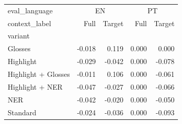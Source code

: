 \begin{tabular}{lrrrr}
\toprule
eval\_language & \multicolumn{2}{c}{EN} & \multicolumn{2}{c}{PT} \\
context\_label & Full & Target & Full & Target \\
variant &  &  &  &  \\
\midrule
Glosses & -0.018 & 0.119 & 0.000 & 0.000 \\
Highlight & -0.029 & -0.042 & 0.000 & -0.078 \\
Highlight + Glosses & -0.011 & 0.106 & 0.000 & -0.061 \\
Highlight + NER & -0.047 & -0.027 & 0.000 & -0.066 \\
NER & -0.042 & -0.020 & 0.000 & -0.050 \\
Standard & -0.024 & -0.036 & 0.000 & -0.093 \\
\bottomrule
\end{tabular}
